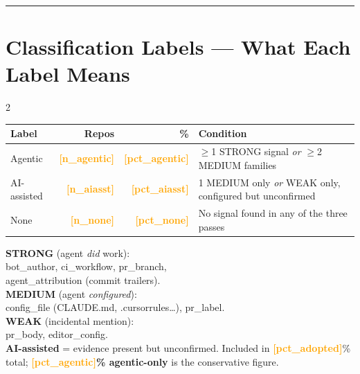 \documentclass[10pt,a4paper]{article}
\newcommand{\FILLIN}[1]{\textcolor{orange}{\textbf{[#1]}}}
\begin{document}

\vspace{6pt}
\hrule
\vspace{6pt}

\section*{Classification Labels --- What Each Label Means}

\begin{multicols}{2}

\begin{tabular}{@{}lrrp{4.2cm}@{}}
\toprule
Label & Repos & \% & Condition \\
\midrule
Agentic     & \FILLIN{n\_agentic} & \FILLIN{pct\_agentic} &
  $\geq$1 STRONG signal \emph{or} $\geq$2 MEDIUM families \\[2pt]
AI-assisted & \FILLIN{n\_aiasst} & \FILLIN{pct\_aiasst} &
  1 MEDIUM only \emph{or} WEAK only, configured but unconfirmed \\[2pt]
None        & \FILLIN{n\_none} & \FILLIN{pct\_none} &
  No signal found in any of the three passes \\
\bottomrule
\end{tabular}

\columnbreak

\textbf{STRONG} (agent \emph{did} work):\\
bot\_author, ci\_workflow, pr\_branch,\\
agent\_attribution (commit trailers).\\[4pt]
\textbf{MEDIUM} (agent \emph{configured}):\\
config\_file (CLAUDE.md, .cursorrules\ldots), pr\_label.\\[4pt]
\textbf{WEAK} (incidental mention):\\
pr\_body, editor\_config.\\[4pt]
\textbf{AI-assisted} = evidence present but unconfirmed.
Included in \FILLIN{pct\_adopted}\% total;
\textbf{\FILLIN{pct\_agentic}\% agentic-only}
is the conservative figure.

\end{multicols}
\end{document}
